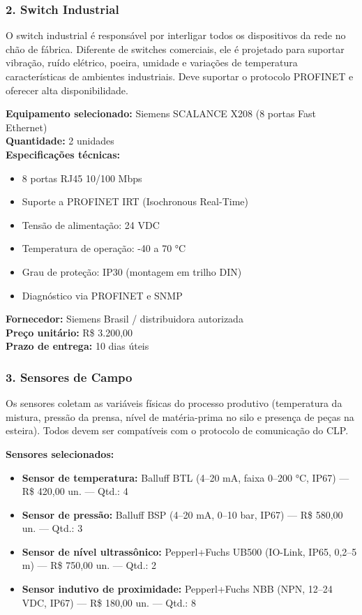 \documentclass[12pt,a4paper]{article}
\begin{document}
\subsubsection*{2. Switch Industrial}

O switch industrial é responsável por interligar todos os dispositivos da rede no chão
de fábrica. Diferente de switches comerciais, ele é projetado para suportar vibração,
ruído elétrico, poeira, umidade e variações de temperatura características de ambientes
industriais. Deve suportar o protocolo PROFINET e oferecer alta disponibilidade.

\textbf{Equipamento selecionado:} Siemens SCALANCE X208 (8 portas Fast Ethernet)\\
\textbf{Quantidade:} 2 unidades\\
\textbf{Especificações técnicas:}
\begin{itemize}[leftmargin=1.5cm, itemsep=1pt]
    \item 8 portas RJ45 10/100 Mbps
    \item Suporte a PROFINET IRT (Isochronous Real-Time)
    \item Tensão de alimentação: 24 VDC
    \item Temperatura de operação: -40 a 70 °C
    \item Grau de proteção: IP30 (montagem em trilho DIN)
    \item Diagnóstico via PROFINET e SNMP
\end{itemize}
\textbf{Fornecedor:} Siemens Brasil / distribuidora autorizada\\
\textbf{Preço unitário:} R\$ 3.200,00\\
\textbf{Prazo de entrega:} 10 dias úteis

\subsubsection*{3. Sensores de Campo}

Os sensores coletam as variáveis físicas do processo produtivo (temperatura da mistura,
pressão da prensa, nível de matéria-prima no silo e presença de peças na esteira).
Todos devem ser compatíveis com o protocolo de comunicação do CLP.

\textbf{Sensores selecionados:}

\begin{itemize}[leftmargin=1.5cm, itemsep=4pt]
    \item \textbf{Sensor de temperatura:} Balluff BTL (4--20 mA, faixa 0--200 °C,
    IP67) --- R\$ 420,00 un. --- Qtd.: 4
    \item \textbf{Sensor de pressão:} Balluff BSP (4--20 mA, 0--10 bar, IP67) ---
    R\$ 580,00 un. --- Qtd.: 3
    \item \textbf{Sensor de nível ultrassônico:} Pepperl+Fuchs UB500 (IO-Link,
    IP65, 0,2--5 m) --- R\$ 750,00 un. --- Qtd.: 2
    \item \textbf{Sensor indutivo de proximidade:} Pepperl+Fuchs NBB (NPN, 12--24 VDC,
    IP67) --- R\$ 180,00 un. --- Qtd.: 8
\end{itemize}
\end{document}
